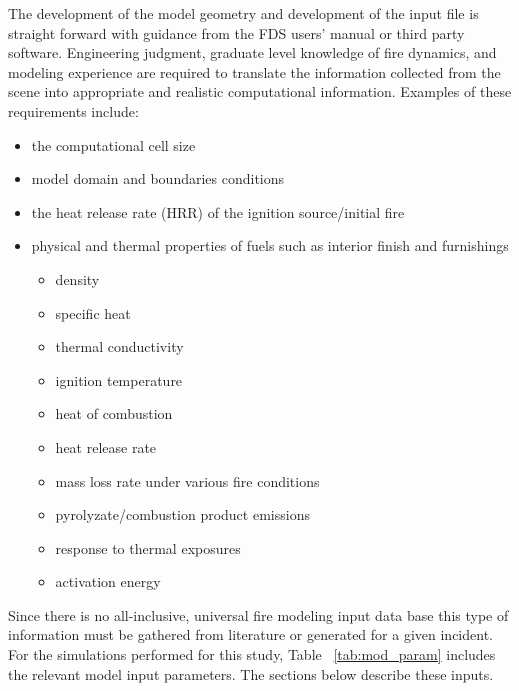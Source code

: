 \documentclass[11pt,oneside]{book}
\begin{document}
The development of the model geometry and development of the input file is straight forward with guidance from the FDS users' manual \cite{FDS_Users_Guide} or third party software.  Engineering judgment, graduate level knowledge of fire dynamics, and modeling experience are required to  translate the information collected from the scene into appropriate and realistic computational information.  Examples of these requirements include:
\begin{itemize}
\item the computational cell size
\item model domain and boundaries conditions
\item the heat release rate (HRR) of the ignition source/initial fire
\item physical and thermal properties of fuels such as interior finish and furnishings
	\begin{itemize}
	\item density
	\item specific heat
	\item thermal conductivity
	\item ignition temperature
	\item heat of combustion
	\item heat release rate
	\item mass loss rate under various fire conditions
	\item pyrolyzate/combustion product emissions
	\item response to thermal exposures
	\item activation energy
	\end{itemize}
\end{itemize}
Since there is no all-inclusive, universal fire modeling input data base this type of information must be gathered from literature or generated for a given incident. For the simulations performed for this study, Table ~\ref{tab:mod_param} includes the relevant model input parameters. The sections below describe these inputs. 
\end{document}
